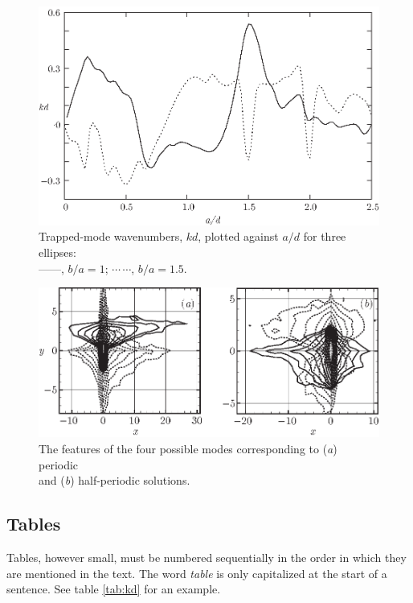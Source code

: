 \documentclass{jfm}
\begin{document}
\begin{figure}
  \centerline{\includegraphics{trapped}}%
  \caption{Trapped-mode wavenumbers, $kd$, plotted against $a/d$ for
    three ellipses:\protect\\
    ---$\!$---,
    $b/a=1$; $\cdots$\,$\cdots$, $b/a=1.5$.}
\label{fig:ka}
\end{figure}

\begin{figure}
  \centerline{\includegraphics{modes}}
  \caption{The features of the four possible modes corresponding to
  (\textit{a}) periodic\protect\\ and (\textit{b}) half-periodic solutions.}
\label{fig:kd}
\end{figure}

\subsection{Tables}
Tables, however small, must be numbered sequentially in the order in which they are mentioned in the text. The word \textit {table} is only capitalized at the start of a sentence. See table \ref{tab:kd} for an example.
\end{document}
